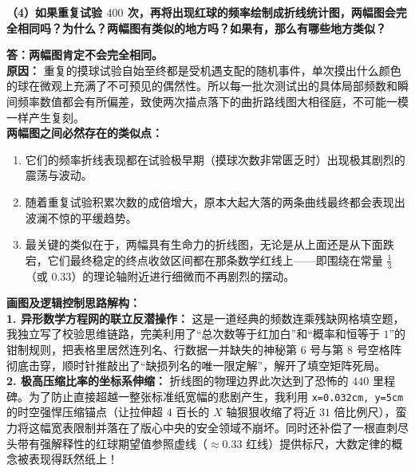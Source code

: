 \textbf{（4）如果重复试验 $400$ 次，再将出现红球的频率绘制成折线统计图，两幅图会完全相同吗？为什么？两幅图有类似的地方吗？如果有，那么有哪些地方类似？}

\vspace{0.2cm}
\textbf{答：两幅图肯定不会完全相同。}\\
\textbf{原因：} 重复的摸球试验自始至终都是受机遇支配的随机事件，单次摸出什么颜色的球在微观上充满了不可预见的偶然性。所以每一批次测试出的具体局部频数和瞬间频率数值都会有所偏差，致使两次描点落下的曲折路线图大相径庭，不可能一模一样产生复刻。\\
\textbf{两幅图之间必然存在的类似点：} 
\begin{enumerate}
    \item 它们的频率折线表现都在试验极早期（摸球次数非常匮乏时）出现极其剧烈的震荡与波动。
    \item 随着重复试验积累次数的成倍增大，原本大起大落的两条曲线最终都会表现出波澜不惊的平缓趋势。
    \item 最关键的类似在于，两幅具有生命力的折线图，无论是从上面还是从下面跌宕，它们最终稳定的终点收敛区间都在那条数学红线上——即围绕在常量 $\frac{1}{3}$（或 $0.33$）的理论轴附近进行细微而不再剧烈的摆动。
\end{enumerate}

\vspace{0.6cm}

{\small\color{blue!70!black}
\textbf{画图及逻辑控制思路解构：}\\
\textbf{1. 异形数学方程网的联立反潜操作：} 这是一道经典的频数连乘残缺网格填空题，我独立写了校验思维链路，完美利用了“总次数等于红加白”和“概率和恒等于 $1$”的钳制规则，把表格里居然连列名、行数据一并缺失的神秘第 $6$ 号与第 $8$ 号空格阵彻底击穿，顺时针推敲出了“缺损列名的唯一限定解”，解开了填空矩阵死局。\\
\textbf{2. 极高压缩比率的坐标系伸缩：} 折线图的物理边界此次达到了恐怖的 $440$ 里程碑。为了防止直接超越一整张标准纸宽幅的悲剧产生，我利用 \texttt{x=0.032cm, y=5cm} 的时空强悍压缩锚点（让拉伸超 $4$ 百长的 $X$ 轴狠狠收缩了将近 $31$ 倍比例尺），蛮力将这幅宽表限制并落在了版心中央的安全领域不崩坏。同时还补偿了一根直刺尽头带有强解释性的红球期望值参照虚线（$\approx 0.33$ 红线）提供标尺，大数定律的概念被表现得跃然纸上！
}


\newpage




\newpage

